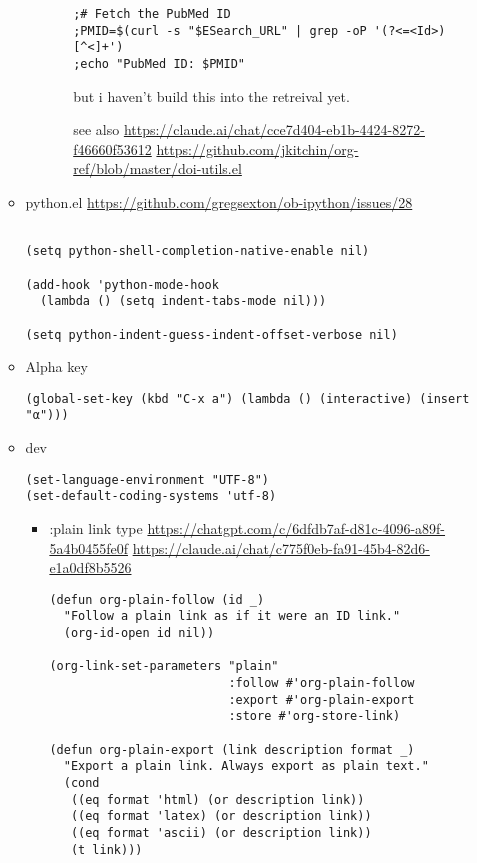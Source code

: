 \documentclass{article}
\begin{document}
\begin{itemize}
\begin{itemize}
\begin{itemize}
\begin{itemize}
\begin{verbatim}
;# Fetch the PubMed ID
;PMID=$(curl -s "$ESearch_URL" | grep -oP '(?<=<Id>)[^<]+')
;echo "PubMed ID: $PMID"
\end{verbatim}

but i haven't build this into the retreival yet.

see also \url{https://claude.ai/chat/cce7d404-eb1b-4424-8272-f46660f53612}
\url{https://github.com/jkitchin/org-ref/blob/master/doi-utils.el}
\end{itemize}
\end{itemize}
\item python.el
\label{sec:org3356cd3}
\url{https://github.com/gregsexton/ob-ipython/issues/28}
\begin{verbatim}

(setq python-shell-completion-native-enable nil)

(add-hook 'python-mode-hook
  (lambda () (setq indent-tabs-mode nil)))

(setq python-indent-guess-indent-offset-verbose nil)
\end{verbatim}
\item Alpha key
\label{sec:orgdfff03c}
\begin{verbatim}
(global-set-key (kbd "C-x a") (lambda () (interactive) (insert "α")))
\end{verbatim}
\item dev
\label{sec:orga46922f}
\begin{verbatim}
(set-language-environment "UTF-8")
(set-default-coding-systems 'utf-8)
\end{verbatim}

\begin{itemize}
\item :plain link type
\label{sec:orgf551bc1}
\url{https://chatgpt.com/c/6dfdb7af-d81c-4096-a89f-5a4b0455fe0f}
\url{https://claude.ai/chat/c775f0eb-fa91-45b4-82d6-e1a0df8b5526}
\begin{verbatim}
(defun org-plain-follow (id _)
  "Follow a plain link as if it were an ID link."
  (org-id-open id nil))

(org-link-set-parameters "plain"
                         :follow #'org-plain-follow
                         :export #'org-plain-export
                         :store #'org-store-link)

(defun org-plain-export (link description format _)
  "Export a plain link. Always export as plain text."
  (cond
   ((eq format 'html) (or description link))
   ((eq format 'latex) (or description link))
   ((eq format 'ascii) (or description link))
   (t link)))


\end{verbatim}
\end{itemize}
\end{itemize}
\end{itemize}
\end{document}
